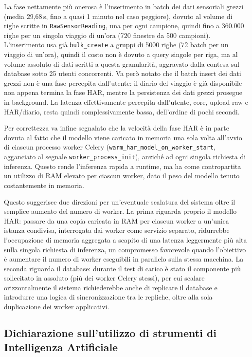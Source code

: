 \documentclass[conference]{IEEEtran}
\begin{document}
La fase nettamente più onerosa è l'inserimento in batch dei dati
sensoriali grezzi (media 29,68\,s, fino a quasi 1 minuto nel caso
peggiore), dovuto al volume di righe scritte in
\texttt{RawSensorReading}, una per ogni campione, quindi fino a
360.000 righe per un singolo viaggio di un'ora (720 finestre da 500
campioni). L'inserimento usa già \texttt{bulk\_create} a gruppi di
5000 righe (72 batch per un viaggio di un'ora), quindi il costo non
è dovuto a query singole per riga, ma al volume assoluto di dati
scritti a questa granularità, aggravato dalla contesa sul database
sotto 25 utenti concorrenti. 
Va però notato che il batch insert dei dati grezzi non è una fase
percepita dall'utente: il diario del viaggio è già disponibile non
appena termina la fase HAR, mentre la persistenza dei dati grezzi
prosegue in background. La latenza effettivamente percepita
dall'utente, core, upload raw e HAR/diario, resta quindi
complessivamente bassa, dell'ordine di pochi secondi.

Per correttezza va infine segnalato che la velocità della fase HAR
è in parte dovuta al fatto che il modello viene caricato in memoria
una sola volta all'avvio di ciascun processo worker Celery
(\texttt{warm\_har\_model\_on\_worker\_start}, agganciato al segnale
\texttt{worker\_process\_init}), anziché ad ogni singola richiesta di
inferenza. Questo rende l'inferenza rapida a runtime, ma ha come
contropartita un utilizzo di RAM elevato per ciascun worker, dato il
peso del modello tenuto costantemente in memoria.

Questo suggerisce due direzioni per un'eventuale scalatura del
sistema oltre il semplice aumento del numero di worker. La prima
riguarda proprio il modello HAR: passare da una copia caricata in
RAM per ciascun worker a un'unica istanza condivisa, interrogata dai
worker come servizio separato, ridurrebbe l'occupazione di memoria
aggregata a scapito di una latenza leggermente più alta sulla
singola richiesta di inferenza, un compromesso favorevole quando
l'obiettivo è aumentare il numero di worker eseguibili in parallelo
sulla stessa macchina. La seconda riguarda il database: durante il
test di carico è stato il componente più sollecitato in assoluto (più
dei worker Celery stessi), per cui scalare orizzontalmente il sistema
richiederebbe anche di replicare il database e introdurre una logica
di sincronizzazione tra le repliche, oltre alla sola duplicazione dei
worker applicativi.

\subsection*{Dichiarazione sull'utilizzo di strumenti di Intelligenza Artificiale}
\end{document}

